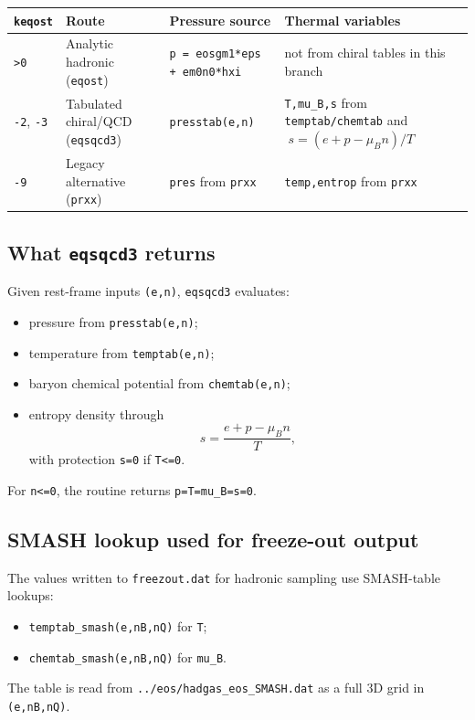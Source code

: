 \documentclass[11pt,a4paper]{article}
\begin{document}
\begin{longtable}{|p{2.1cm}|p{3.3cm}|p{3.9cm}|p{4.0cm}|}
\hline
\textbf{\texttt{keqost}} & \textbf{Route} & \textbf{Pressure source} & \textbf{Thermal variables} \\\hline
\texttt{>0} & Analytic hadronic (\texttt{eqost}) &
\texttt{p = eosgm1*eps + em0n0*hxi} &
not from chiral tables in this branch \\\hline
\texttt{-2}, \texttt{-3} & Tabulated chiral/QCD (\texttt{eqsqcd3}) &
\texttt{presstab(e,n)} &
\texttt{T,mu\_B,s} from \texttt{temptab/chemtab} and
\(\;s=(e+p-\mu_B n)/T\;\) \\\hline
\texttt{-9} & Legacy alternative (\texttt{prxx}) &
\texttt{pres} from \texttt{prxx} &
\texttt{temp,entrop} from \texttt{prxx} \\\hline
\end{longtable}

\subsection{What \texttt{eqsqcd3} returns}
Given rest-frame inputs \texttt{(e,n)}, \texttt{eqsqcd3} evaluates:
\begin{itemize}
\item pressure from \texttt{presstab(e,n)};
\item temperature from \texttt{temptab(e,n)};
\item baryon chemical potential from \texttt{chemtab(e,n)};
\item entropy density through
      \[
      s = \frac{e+p-\mu_B n}{T},
      \]
      with protection \texttt{s=0} if \texttt{T<=0}.
\end{itemize}
For \texttt{n<=0}, the routine returns
\texttt{p=T=mu\_B=s=0}.

\subsection{SMASH lookup used for freeze-out output}
The values written to \texttt{freezout.dat} for hadronic sampling use
SMASH-table lookups:
\begin{itemize}
\item \texttt{temptab\_smash(e,nB,nQ)} for \texttt{T};
\item \texttt{chemtab\_smash(e,nB,nQ)} for \texttt{mu\_B}.
\end{itemize}
The table is read from \texttt{../eos/hadgas\_eos\_SMASH.dat} as a full
3D grid in \texttt{(e,nB,nQ)}.
\end{document}
